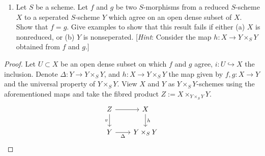 \documentclass[12pt]{amsart}
\begin{document}
\begin{enumerate}
  \item[4.2.] {
      Let $S$ be a scheme.
      Let $f$ and $g$ be two $S$-morphisms from a reduced $S$-scheme $X$ to a seperated $S$-scheme $Y$ which agree on an open dense subset of $X$.
      Show that $f=g$.
      Give examples to show that this result fails if either (a) $X$ is nonreduced, or (b) $Y$ is nonseperated. 
      [\emph{Hint}: Consider the map $h:X\to Y\times_S Y$ obtained from $f$ and $g$.]
    }
\end{enumerate}

\begin{proof}
  Let $U\subset X$ be an open dense subset on which $f$ and $g$ agree, $i:U\hookrightarrow X$ the inclusion.
  Denote $\Delta:Y\to Y\times_S Y$, and $h:X\to Y\times_S Y$ the map given by $f,g:X\to Y$ and the universal property of $Y\times_S Y$.
  View $X$ and $Y$ as $Y\times_S Y$-schemes using the aforementioned maps and take the fibred product $Z:= X\times_{Y\times_SY} Y$.
  \[
    \begin{tikzcd}[column sep=0.75cm]
      Z \ar[d,"v"']\ar[r] & X\ar[d,"h"] \\
      Y\ar[r,"\Delta"']& Y\times_S Y
    \end{tikzcd}
\]
\end{proof}
\end{document}
